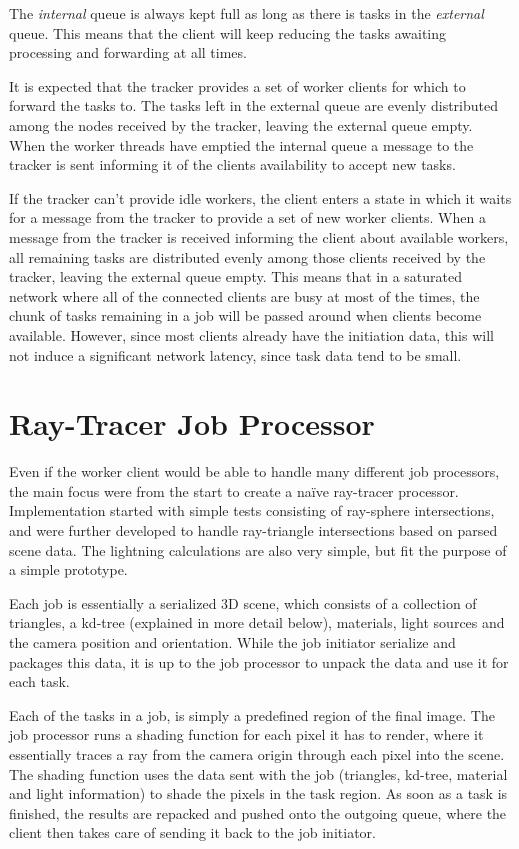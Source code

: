 The \textit{internal} queue is always kept full as long as there is tasks in the
\textit{external} queue. This means that the client will keep reducing the tasks
awaiting processing and forwarding at all times.

It is expected that the tracker provides a set of worker clients for which to
forward the tasks to. The tasks left in the external queue are evenly
distributed among the nodes received by the tracker, leaving the external queue
empty. When the worker threads have emptied the internal queue a message to the
tracker is sent informing it of the clients availability to accept new tasks.

If the tracker can't provide idle workers, the client enters a state in which it
waits for a message from the tracker to provide a set of new worker clients. When a
message from the tracker is received informing the client about available workers,
all remaining tasks are distributed evenly among those clients received by the 
tracker, leaving the external queue empty. This means that in a saturated
network where all of the connected clients are busy at most of the times, the
chunk of tasks remaining in a job will be passed around when clients become
available. However, since most clients already have the initiation data, this
will not induce a significant network latency, since task data tend to be small.


\section{Ray-Tracer Job Processor}
Even if the worker client would be able to handle many different job processors, the main focus were from the start to create a naïve ray-tracer processor. Implementation started with simple tests consisting of ray-sphere intersections, and were further developed to handle ray-triangle intersections based on parsed scene data. The lightning calculations are also very simple, but fit the purpose of a simple prototype.

Each job is essentially a serialized 3D scene, which consists of a collection of triangles, a kd-tree (explained in more detail below), materials, light sources and the camera position and orientation. While the job initiator serialize and packages this data, it is up to the job processor to unpack the data and use it for each task.

Each of the tasks in a job, is simply a predefined region of the final image. The job processor runs a shading function for each pixel it has to render, where it essentially traces a ray from the camera origin through each pixel into the scene. The shading function uses the data sent with the job (triangles, kd-tree, material and light information) to shade the pixels in the task region. As soon as a task is finished, the results are repacked and pushed onto the outgoing queue, where the client then takes care of sending it back to the job initiator.

